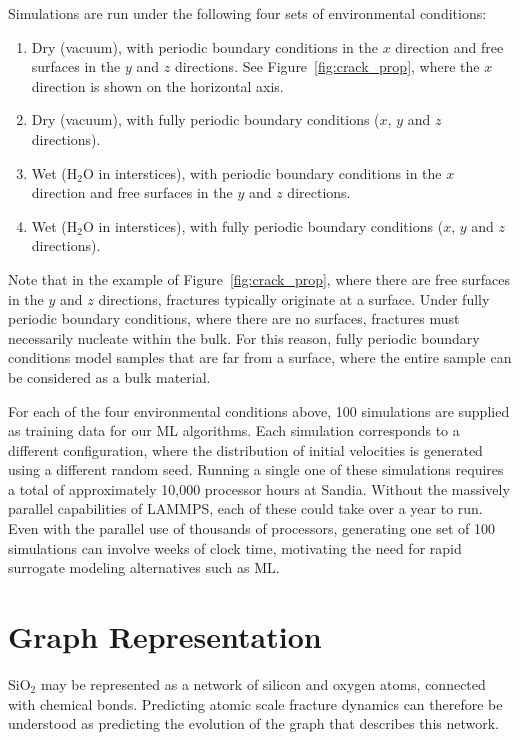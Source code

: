
Simulations are run under the following four sets of environmental conditions:

\begin{enumerate}
    \item Dry (vacuum), with periodic boundary conditions in the $x$ direction and free surfaces in the $y$ and $z$ directions. See Figure~\ref{fig:crack_prop}, where the $x$ direction is shown on the horizontal axis.
    \item Dry (vacuum), with fully periodic boundary conditions ($x$, $y$ and $z$ directions).
    \item Wet (H$_2$O in interstices), with periodic boundary conditions in the $x$ direction and free surfaces in the $y$ and $z$ directions.
    \item Wet (H$_2$O in interstices), with fully periodic boundary conditions ($x$, $y$ and $z$ directions).
\end{enumerate}

\noindent
Note that in the example of Figure~\ref{fig:crack_prop}, where there are free surfaces in the $y$ and $z$ directions, fractures typically originate at a surface.  Under fully periodic boundary conditions, where there are no surfaces, fractures must necessarily nucleate within the bulk. For this reason, fully periodic boundary conditions model samples that are far from a surface, where the entire sample can be considered as a bulk material.

For each of the four environmental conditions above, 100 simulations are supplied as training data for our ML algorithms.  Each simulation corresponds to a different configuration, where the distribution of initial velocities is generated using a different random seed.  Running a single one of these simulations requires a total of approximately 10,000 processor hours at Sandia. Without the massively parallel capabilities of LAMMPS, each of these could take over a year to run.  Even with the parallel use of thousands of processors, generating one set of 100 simulations can involve weeks of clock time, motivating the need for rapid surrogate modeling alternatives such as ML.

\section{Graph Representation}
SiO$_2$ may be represented as a network of silicon and oxygen atoms, connected with chemical bonds.  Predicting atomic scale fracture dynamics can therefore be understood as predicting the evolution of the graph that describes this network.

